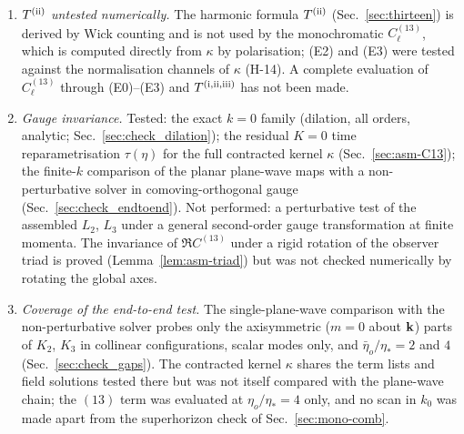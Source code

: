 \begin{enumerate}
explicit one-dimensional integrals with complete integrands and limits: the third-order Green's integral
$\int_0^\eta G_\Phi K_{3c,S_\Phi}\dd\eta'$ in $\Phi_{3c}$ \eqref{eq:third_eqs}, hence $V_{3c}$ and $\Delta^{\rm(iii)}_\ell$ \eqref{eq:asm-classiii}; the ray
functionals $\mathcal F_\ell$, $\mathcal X_{\perp\ell}$, $\mathcal X_{r\ell}$ \eqref{eq:asm-Dl} and their second-order analogues; the transfer functions
$\Delta^\kappa_\ell$ of the contracted kernel (a $\mu$-integral of time integrals); the type-C and type-D $\mu$-integrands of $C^{(22)}_\ell$, which
are projected on $Y_{\ell m}$ by sky quadrature (no closed form beyond \eqref{eq:K2lm}, \eqref{eq:asm-Dl}).  The loop integrals over $k$, $q$, $\mu$
are evaluated numerically for the monochromatic spectrum only.
\item \emph{$T^{\rm(ii)}$ untested numerically.}  The harmonic formula $T^{\rm(ii)}$ (Sec.~\ref{sec:thirteen}) is derived by Wick counting and
is not used by the monochromatic $C^{(13)}_\ell$, which is computed directly from $\kappa$ by polarisation; (E2) and (E3) were tested against the
normalisation channels of $\kappa$ (H-14).  A complete evaluation of $C^{(13)}_\ell$ through (E0)--(E3) and $T^{\rm(i,ii,iii)}$ has not been made.
\item \emph{Gauge invariance.}  Tested: the exact $k=0$ family (dilation, all orders, analytic; Sec.~\ref{sec:check_dilation}); the residual $K=0$
time reparametrisation $\tau(\eta)$ for the full contracted kernel $\kappa$ (Sec.~\ref{sec:asm-C13}); the finite-$k$ comparison of the planar
plane-wave maps with a non-perturbative solver in comoving-orthogonal gauge (Sec.~\ref{sec:check_endtoend}).  Not performed: a perturbative test
of the assembled $L_2$, $L_3$ under a general second-order gauge transformation at finite momenta.  The invariance of $\Re C^{(13)}$ under a rigid
rotation of the observer triad is proved (Lemma~\ref{lem:asm-triad}) but was not checked numerically by rotating the global axes.
\item \emph{Coverage of the end-to-end test.}  The single-plane-wave comparison with the non-perturbative solver probes only the axisymmetric
($m=0$ about $\mathbf k$) parts of $K_2$, $K_3$ in collinear configurations, scalar modes only, and $\bar\eta_o/\eta_*=2$ and $4$
(Sec.~\ref{sec:check_gaps}).  The contracted kernel $\kappa$ shares the term lists and field solutions tested there but was not itself compared
with the plane-wave chain; the $(13)$ term was evaluated at $\eta_o/\eta_*=4$ only, and no scan in
$k_0$ was made apart from the superhorizon check of Sec.~\ref{sec:mono-comb}.

\end{enumerate}

